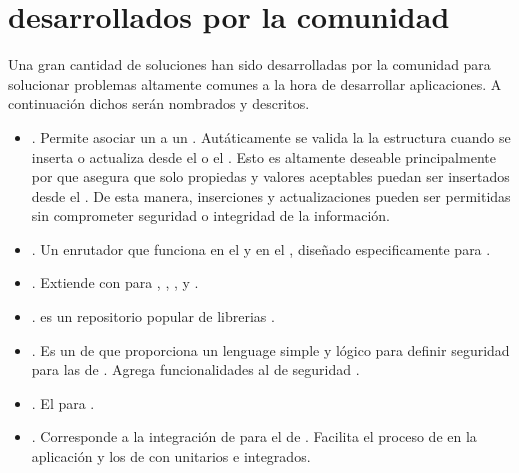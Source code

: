 \section{\packagesAS desarrollados por la comunidad}
Una gran cantidad de soluciones han sido desarrolladas por la comunidad para solucionar problemas altamente comunes a la hora de desarrollar aplicaciones. A continuación dichos \packagesAS serán nombrados y descritos.

	\begin{itemize}
		\item
			\textbf{\nameCollectionTwo}. Permite asociar un \schemaDB a un \mongoCollection. Autáticamente se valida la la estructura cuando se inserta o actualiza desde el \clientAS o el \serverAS. Esto es altamente deseable principalmente por que asegura que solo propiedas y valores aceptables puedan ser insertados desde el \clientAS. De esta manera, inserciones y actualizaciones \clientSideAS pueden ser permitidas sin comprometer seguridad o integridad de la información.
		\item
			\textbf{\nameRouter}. Un enrutador que funciona en el \serverAS y en el \browserINT, diseñado especificamente para \meteorNAME.
		\item
			\textbf{\nameCollectionHooks}. Extiende \mongoCollection con \hooksCPT \beforeAfterDB para \insertDB, \updateDB, \removeDB, \findDB y \findOneDB.
		\item
			\textbf{\nameBower}. \bowerIONAME es un repositorio popular de librerias \javaScriptNAME \clientSideAS.
		\item
			\textbf{\securityPackage}. Es un \packageAS de \meteorNAME que proporciona un lenguage \apiAS simple y lógico para definir seguridad para las \collectionsMETEOR de \mongodbNAME. Agrega funcionalidades al \coreAS de  seguridad \allowdenyCPT.
		\item
			\textbf{\velocityCorePackage}. El \testRunnerCPT \reactive para \meteorNAME.
		\item
			\textbf{\sanjoJasminePackage}. Corresponde a la integración de \meteorNAME \velocityNAME para el \frameworkPC de \testingCPT {}. Facilita el proceso de \testingCPT en la aplicación y los \packageAS de \meteorNAME con \testsCPT unitarios e integrados.

\end{itemize}
